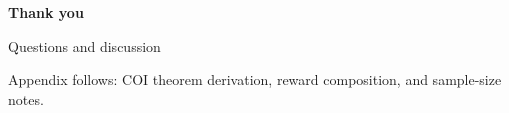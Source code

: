 \documentclass[aspectratio=169,11pt]{beamer}
\begin{document}
\begin{frame}[plain]
  \centering
  \vfill
  {\LARGE\bfseries Thank you}
  \vspace{0.8em}

  {\large Questions and discussion}

  \vfill
  {\footnotesize\color{PhantomSlate}Appendix follows: COI theorem derivation, reward composition, and sample-size notes.}
  \vfill
\end{frame}

\appendix

\end{document}
